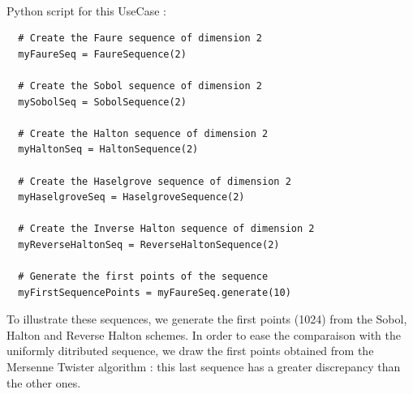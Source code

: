 \textspace\\
Python  script for this UseCase :

\begin{lstlisting}
  # Create the Faure sequence of dimension 2
  myFaureSeq = FaureSequence(2)

  # Create the Sobol sequence of dimension 2
  mySobolSeq = SobolSequence(2)

  # Create the Halton sequence of dimension 2
  myHaltonSeq = HaltonSequence(2)

  # Create the Haselgrove sequence of dimension 2
  myHaselgroveSeq = HaselgroveSequence(2)

  # Create the Inverse Halton sequence of dimension 2
  myReverseHaltonSeq = ReverseHaltonSequence(2)

  # Generate the first points of the sequence
  myFirstSequencePoints = myFaureSeq.generate(10)
\end{lstlisting}


To illustrate these sequences, we generate the first points (1024) from the Sobol, Halton and Reverse Halton schemes. In order to ease the comparaison with the uniformly ditributed sequence, we draw the first points obtained from the Mersenne Twister algorithm : this last sequence has a greater discrepancy than the other ones.



